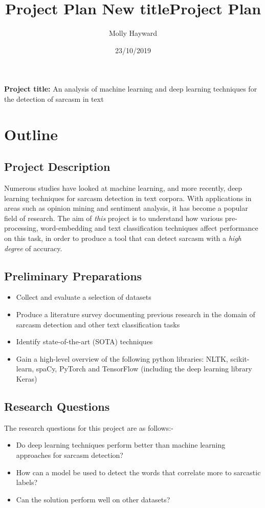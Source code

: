 \documentclass[12pt,a4paper]{article}
\title{Project Plan \large \newline 
New title}
\title{Project Plan}
\author{Molly Hayward}
\date{23/10/2019}
\begin{document}
\maketitle

\noindent \textbf{Project title:} An analysis of machine learning and deep learning techniques for the detection of sarcasm in text

\section{Outline}
\subsection{Project Description}
\noindent Numerous studies have looked at machine learning, and more recently, deep learning  techniques for sarcasm detection in text corpora. With applications in areas such as opinion mining and sentiment analysis, it has become a popular field of research. The aim of \textit{this} project is to understand how various pre-processing, word-embedding and text classification techniques affect performance on this task, in order to produce a tool that can detect sarcasm with a \textit{high degree} of accuracy.\\

\subsection{Preliminary Preparations}
\begin{itemize}
	\setlength\itemsep{0em}
	\item Collect and evaluate a selection of datasets
	\item Produce a literature survey documenting previous research in the domain of sarcasm detection and other text classification tasks
	\item Identify state-of-the-art (SOTA) techniques
	\item Gain a high-level overview of the following python libraries: NLTK, scikit-learn, spaCy, PyTorch and TensorFlow (including the deep learning library Keras)
\end{itemize}
\subsection{Research Questions}
The research questions for this project are as follows:-
\begin{itemize}
	\setlength\itemsep{0em}
	\item Do deep learning techniques perform better than machine learning approaches for sarcasm detection?
	\item How can a model be used to detect the words that correlate more to sarcastic labels?
	\item Can the solution perform well on other datasets?
\end{itemize}
\end{document}
